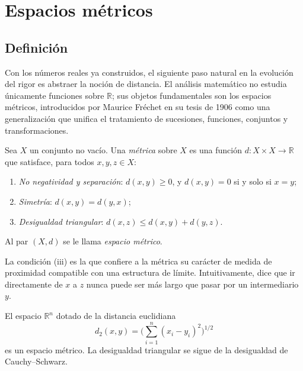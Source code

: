 \chapter{Espacios métricos}
\label{ch:espacios-metricos}

\section{Definición}

Con los números reales ya construidos, el siguiente paso natural en la evolución del rigor es abstraer la noción de distancia. El análisis matemático no estudia únicamente funciones sobre $\mathbb{R}$; sus objetos fundamentales son los espacios métricos, introducidos por Maurice Fréchet en su tesis de 1906 como una generalización que unifica el tratamiento de sucesiones, funciones, conjuntos y transformaciones.

\begin{definition}
\label{def:metrica}
Sea $X$ un conjunto no vacío. Una \emph{métrica} sobre $X$ es una función $d\colon X\times X\to\mathbb{R}$ que satisface, para todos $x,y,z\in X$:
\begin{enumerate}
  \item[(i)] \emph{No negatividad y separación}: $d(x,y)\geq 0$, y $d(x,y)=0$ si y solo si $x=y$;
  \item[(ii)] \emph{Simetría}: $d(x,y)=d(y,x)$;
  \item[(iii)] \emph{Desigualdad triangular}: $d(x,z)\leq d(x,y)+d(y,z)$.
\end{enumerate}
Al par $(X,d)$ se le llama \emph{espacio métrico}.
\end{definition}

La condición (iii) es la que confiere a la métrica su carácter de medida de proximidad compatible con una estructura de límite. Intuitivamente, dice que ir directamente de $x$ a $z$ nunca puede ser más largo que pasar por un intermediario $y$.

\begin{example}
\label{ej:euclidea}
El espacio $\mathbb{R}^n$ dotado de la distancia euclidiana
\begin{equation}\label{eq:euclidea}
  d_2(x,y)=\biggl(\sum_{i=1}^{n}(x_i-y_i)^2\biggr)^{1/2}
\end{equation}
es un espacio métrico. La desigualdad triangular se sigue de la desigualdad de Cauchy--Schwarz.
\end{example}

